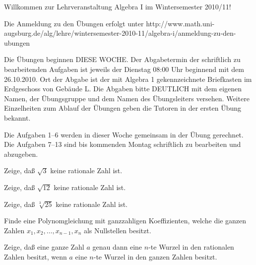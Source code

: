 \documentclass{algsheet}
\author{Dipl.-Math.~Franz Vogler}
\date{19.~Oktober 2010}
\begin{document}
                \maketitle


Willkommen zur Lehrveranstaltung Algebra I im Wintersemester 2010/11!
\newline

Die Anmeldung zu den Übungen erfolgt unter
\newline
http://www.math.uni-augsburg.de/alg/lehre/wintersemester-2010-11/algebra-i/anmeldung-zu-den-ubungen

\newline 

Die Übungen beginnen DIESE WOCHE. Der Abgabetermin der schriftlich zu bearbeitenden Aufgaben ist jeweils der Dienstag 08:00 Uhr beginnend mit dem 26.10.2010. Ort der Abgabe ist der mit
 \glqq Algebra 1\grqq\; gekennzeichnete Briefkasten im Erdgeschoss von Gebäude L. Die Abgaben bitte DEUTLICH mit dem eigenen
Namen, der Übungsgruppe und dem Namen des Übungsleiters versehen. Weitere Einzelheiten zum Ablauf der Übungen geben die Tutoren in der ersten Übung bekannt.
\newline

Die Aufgaben 1--6 werden in dieser Woche gemeinsam in der Übung gerechnet. Die Aufgaben 7--13 sind bis kommenden Montag schriftlich zu bearbeiten und abzugeben. 

\begin{exercise} 
 Zeige, daß \(\sqrt 3\) keine rationale Zahl ist.
\end{exercise}





\begin{exercise}
Zeige, daß \(\sqrt{12}\) keine rationale Zahl ist.
\end{exercise}



\begin{exercise}
    Zeige, daß \(\sqrt[3]{25}\) keine rationale Zahl ist.
\end{exercise}



\begin{exercise}
 Finde eine Polynomgleichung mit ganzzahligen Koeffizienten, welche die ganzen Zahlen $x_1,x_2,\dots,x_{n-1},x_n$ als Nullstellen besitzt.  
\end{exercise}



\begin{exercise}
    Zeige, daß eine ganze Zahl \(a\) genau dann eine
    \(n\)-te Wurzel in den rationalen Zahlen besitzt, wenn
    \(a\) eine \(n\)-te Wurzel in den ganzen Zahlen besitzt.

\end{exercise}
\end{document}

